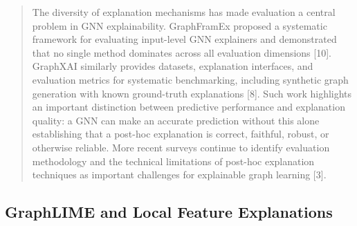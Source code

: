 \documentclass[a4paper]{article}
\begin{document}
\begin{quote}
The diversity of explanation mechanisms has made evaluation a central
problem in GNN explainability. GraphFramEx proposed a systematic
framework for evaluating input-level GNN explainers and demonstrated
that no single method dominates across all evaluation dimensions
{[}10{]}. GraphXAI similarly provides datasets, explanation interfaces,
and evaluation metrics for systematic benchmarking, including synthetic
graph generation with known ground-truth explanations {[}8{]}. Such work
highlights an important distinction between predictive performance and
explanation quality: a GNN can make an accurate prediction without this
alone establishing that a post-hoc explanation is correct, faithful,
robust, or otherwise reliable. More recent surveys continue to identify
evaluation methodology and the technical limitations of post-hoc
explanation techniques as important challenges for explainable graph
learning {[}3{]}.
\end{quote}

\subsection{\texorpdfstring{GraphLIME and Local Feature Explanations
}{GraphLIME and Local Feature Explanations }}\label{graphlime-and-local-feature-explanations}
\end{document}
